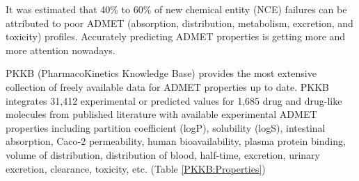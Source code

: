 It was estimated that 40\% to 60\% of new chemical entity (NCE) failures can be attributed to poor ADMET (absorption, distribution, metabolism, excretion, and toxicity) profiles. Accurately predicting ADMET properties is getting more and more attention nowadays.

PKKB (PharmacoKinetics Knowledge Base) \citep{1133} provides the most extensive collection of freely available data for ADMET properties up to date. PKKB integrates 31,412 experimental or predicted values for 1,685 drug and drug-like molecules from published literature with available experimental ADMET properties including partition coefficient (logP), solubility (logS), intestinal absorption, Caco-2 permeability, human bioavailability, plasma protein binding, volume of distribution, distribution of blood, half-time, excretion, urinary excretion, clearance, toxicity, etc. (Table \ref{PKKB:Properties})

